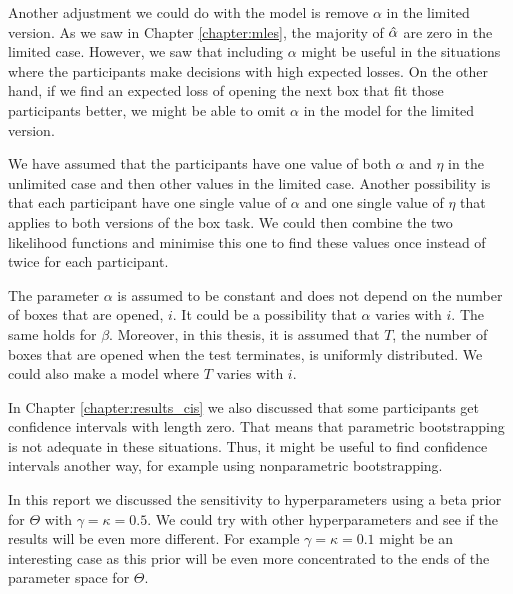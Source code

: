 Another adjustment we could do with the model is remove $\alpha$ in the limited version. As we saw in Chapter \ref{chapter:mles}, the majority of $\hat{\alpha}$ are zero in the limited case. However, we saw that including $\alpha$ might be useful in the situations where the participants make decisions with high expected losses. On the other hand, if we find an expected loss of opening the next box that fit those participants better, we might be able to omit $\alpha$ in the model for the limited version.

We have assumed that the participants have one value of both $\alpha$ and $\eta$ in the unlimited case and then other values in the limited case. Another possibility is that each participant have one single value of $\alpha$ and one single value of $\eta$ that applies to both versions of the box task. We could then combine the two likelihood functions and minimise this one to find these values once instead of twice for each participant. 

The parameter $\alpha$ is assumed to be constant and does not depend on the number of boxes that are opened, $i$. It could be a possibility that $\alpha$ varies with $i$. The same holds for $\beta$. Moreover, in this thesis, it is assumed that $T$, the number of boxes that are opened when the test terminates, is uniformly distributed. We could also make a model where $T$ varies with $i$.

In Chapter \ref{chapter:results_cis} we also discussed that some participants get confidence intervals with length zero. That means that parametric bootstrapping is not adequate in these situations. Thus, it might be useful to find confidence intervals another way, for example using nonparametric bootstrapping. 

In this report we discussed the sensitivity to hyperparameters using a beta prior for $\Theta$ with $\gamma=\kappa=0.5$. We could try with other hyperparameters and see if the results will be even more different. For example $\gamma=\kappa=0.1$ might be an interesting case as this prior will be even more concentrated to the ends of the parameter space for $\Theta$. 


